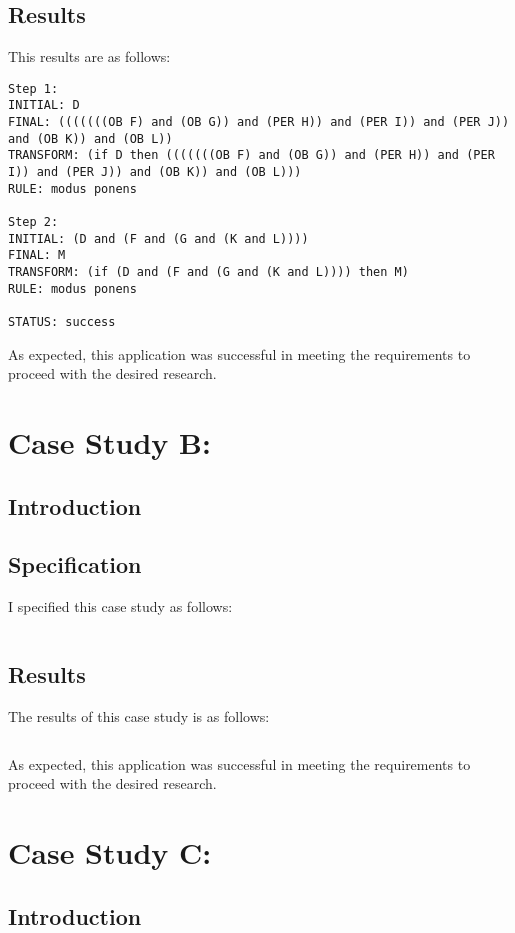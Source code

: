 \documentclass{l4proj}
\begin{document}
\subsection{Results}
This results are as follows: 
\begin{verbatim}
Step 1: 
INITIAL: D
FINAL: (((((((OB F) and (OB G)) and (PER H)) and (PER I)) and (PER J)) and (OB K)) and (OB L))
TRANSFORM: (if D then (((((((OB F) and (OB G)) and (PER H)) and (PER I)) and (PER J)) and (OB K)) and (OB L)))
RULE: modus ponens

Step 2: 
INITIAL: (D and (F and (G and (K and L))))
FINAL: M
TRANSFORM: (if (D and (F and (G and (K and L)))) then M)
RULE: modus ponens

STATUS: success
\end{verbatim}

As expected, this application was successful in meeting the requirements to proceed with the desired research. 

\section{Case Study B: }
\subsection{Introduction}
\subsection{Specification}
I specified this case study as follows: 
\begin{verbatim}

\end{verbatim}

\subsection{Results}
The results of this case study is as follows: 
\begin{verbatim}

\end{verbatim}
As expected, this application was successful in meeting the requirements to proceed with the desired research. 

\section{Case Study C: }
\subsection{Introduction}
\end{document}
